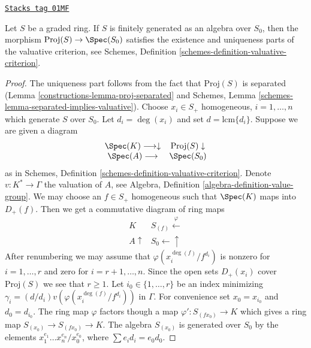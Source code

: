 \begin{lemma}
\label{constructions-lemma-proj-valuative-criterion}
\href{https://stacks.math.columbia.edu/tag/01MF}{\texttt{Stacks tag 01MF}}

Let $S$ be a graded ring. If $S$ is finitely generated as
an algebra over $S_0$, then
the morphism $\text{Proj}(S) \to \Spec(S_0)$ satisfies
the existence and uniqueness parts of the valuative criterion,
see Schemes, Definition \ref{schemes-definition-valuative-criterion}.
\end{lemma}

\begin{proof}

The uniqueness part follows from the fact that $\text{Proj}(S)$ is
separated (Lemma \ref{constructions-lemma-proj-separated} and
Schemes, Lemma \ref{schemes-lemma-separated-implies-valuative}).
Choose $x_i \in S_{+}$ homogeneous, $i = 1, \ldots, n$
which generate $S$ over $S_0$. Let $d_i = \deg(x_i)$ and
set $d = \text{lcm}\{d_i\}$. Suppose we are given a diagram
$$
\begin{array}{cc}\Spec(K) \longrightarrow\downarrow & \text{Proj}(S) \downarrow \\ \Spec(A) \longrightarrow & \Spec(S_0)\end{array}
$$
as in Schemes, Definition \ref{schemes-definition-valuative-criterion}.
Denote $v : K^* \to \Gamma$ the valuation of $A$, see
Algebra, Definition \ref{algebra-definition-value-group}.
We may choose an $f \in S_{+}$ homogeneous such that
$\Spec(K)$ maps into $D_{+}(f)$. Then we get a commutative
diagram of ring maps
$$
\begin{array}{cc}K & S_{(f)} \overset{\varphi}{\longleftarrow} \\ A \uparrow & S_0 \longleftarrow\uparrow\end{array}
$$
After renumbering we may assume that $\varphi(x_i^{\deg(f)}/f^{d_i})$
is nonzero for $i = 1, \ldots, r$ and zero for $i = r + 1, \ldots, n$.
Since the open sets $D_{+}(x_i)$ cover $\text{Proj}(S)$ we see that $r \geq 1$.
Let $i_0 \in \{1, \ldots, r\}$ be an index minimizing
$\gamma_i = (d/d_i)v(\varphi(x_i^{\deg(f)}/f^{d_i}))$ in $\Gamma$.
For convenience set $x_0 = x_{i_0}$ and $d_0 = d_{i_0}$.
The ring map $\varphi$ factors though a map $\varphi' : S_{(fx_0)} \to K$
which gives a ring map $S_{(x_0)} \to S_{(fx_0)} \to K$.
The algebra $S_{(x_0)}$ is generated over $S_0$ by the elements
$x_1^{e_1} \ldots x_n^{e_n}/x_0^{e_0}$, where $\sum e_i d_i = e_0 d_0$.

\end{proof}
